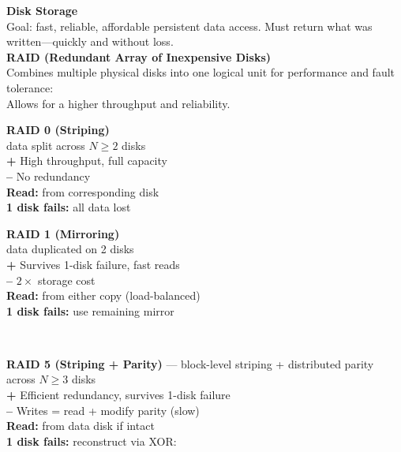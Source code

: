\documentclass[8pt]{extarticle}
\begin{document}
\begin{minipage}[t]{0.5\textwidth}
    \noindent\textbf{Disk Storage} \\
    Goal: fast, reliable, affordable persistent data access. Must return what was written—quickly and without loss.\\
    \noindent\textbf{RAID (Redundant Array of Inexpensive Disks)} \\
    Combines multiple physical disks into one logical unit for performance and fault tolerance:\\
    Allows for a higher throughput and reliability.\\
     \begin{minipage}[htp]{0.48\textwidth}
            \textbf{RAID 0 (Striping)}\\
            data split across $N \geq 2$ disks\\
            \textbf{+} High throughput, full capacity\\
            \textbf{--} No redundancy\\
            \textbf{Read:} from corresponding disk\\
            \textbf{1 disk fails:} all data lost
        \end{minipage}
        \hfill
        \begin{minipage}[htp]{0.48\textwidth}
            \textbf{RAID 1 (Mirroring)}\\
            data duplicated on 2 disks\\
            \textbf{+} Survives 1-disk failure, fast reads\\
            \textbf{--} $2\times$ storage cost\\
            \textbf{Read:} from either copy (load-balanced)\\
            \textbf{1 disk fails:} use remaining mirror
        \end{minipage}\\
\begin{minipage}[htp]{0.48\textwidth}
            \textbf{RAID 5 (Striping + Parity)} — block-level striping + distributed parity across $N \geq 3$ disks\\
            \textbf{+} Efficient redundancy, survives 1-disk failure\\
            \textbf{--} Writes = read + modify parity (slow)\\
            \textbf{Read:} from data disk if intact\\
            \textbf{1 disk fails:} reconstruct via XOR:\\

\end{minipage}
\end{minipage}
\end{document}
